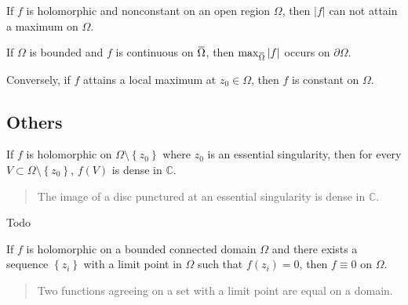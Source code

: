 \begin{theorem}

If \(f\) is holomorphic and nonconstant on an open region \(\Omega\),
then \({\left\lvert {f} \right\rvert}\) can not attain a maximum on
\(\Omega\).

If \(\Omega\) is bounded and \(f\) is continuous on
\(\mkern 1.5mu\overline{\mkern-1.5mu\Omega\mkern-1.5mu}\mkern 1.5mu\),
then
\(\max_{\mkern 1.5mu\overline{\mkern-1.5mu\Omega\mkern-1.5mu}\mkern 1.5mu} {\left\lvert {f} \right\rvert}\)
occurs on \({{\partial}}\Omega\).

Conversely, if \(f\) attains a local maximum at \(z_0 \in \Omega\), then
\(f\) is constant on \(\Omega\).

\end{theorem}

\hypertarget{others-1}{%
\subsection{Others}\label{others-1}}

\begin{theorem}

If \(f\) is holomorphic on \(\Omega\setminus\left\{{z_0}\right\}\) where
\(z_0\) is an essential singularity, then for every
\(V\subset \Omega\setminus\left\{{z_0}\right\}\), \(f(V)\) is dense in
\({\mathbb{C}}\).

\begin{quote}
The image of a disc punctured at an essential singularity is dense in
\({\mathbb{C}}\).
\end{quote}

\end{theorem}

\begin{theorem}

Todo

\end{theorem}


\begin{theorem}

If \(f\) is holomorphic on a bounded connected domain \(\Omega\) and
there exists a sequence \(\left\{{z_i}\right\}\) with a limit point in
\(\Omega\) such that \(f(z_i) = 0\), then \(f\equiv 0\) on \(\Omega\).

\begin{quote}
Two functions agreeing on a set with a limit point are equal on a
domain.
\end{quote}

\end{theorem}

